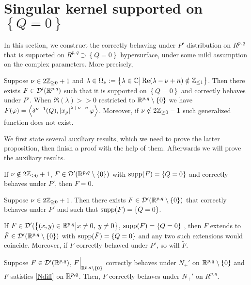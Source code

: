 \documentclass[10pt]{article} %
\newcommand{\D}{\mathcal{D}}
\theoremstyle{definition}
\theoremstyle{remark}
\begin{document}
\section{Singular kernel supported on $\left\{ Q=0 \right\}$}
In this section, we construct the correctly behaving under $P'$ distribution on $R^{p,q}$ that is supported on
$R^{p,q}\supset\left\{ Q=0 \right\}$ hypersurface, under some mild assumption on the complex parameters. More precisely,
\begin{myprop}
	Suppose $\nu\in2\mathbb{Z}_{\geq0}+1$ and $\lambda\in\Omega_\nu:=
	\left\{\lambda\in\mathbb{C}\big| \operatorname{Re}(\lambda-\nu+n)\notin\mathbb{Z}_{\leq1}\right\}$.
	Then there exists $F\in\D'(\R^{p,q})$ such that it is supported on $\left\{ Q=0 \right\}$ and correctly behaves
	under $P'$. When $\Re(\lambda)>>0$ restricted to $\mathbb{R}^{p,q}\setminus\left\{ 0 \right\}$ we have $F(\varphi)=\left<
		\delta^{\nu-1}(Q),\left|x_p\right|^{\lambda+\nu-n}\varphi\right>$.
	Moreover, if $\nu\notin2\mathbb{Z}_{\geq0}-1$ such generalized function does not exist.
	\label{thm:sing_q}
\end{myprop}
We first state several auxiliary results, which we need to prove the latter proposition, then finish a proof with the help of them.
Afterwards we will prove the auxiliary results.
\begin{mylem}
	If $\nu\notin2\mathbb{Z}_{\geq0}+1$, $F\in\D'(\R^{p,q}\setminus\left\{ 0 \right\})$ with $\operatorname{supp}(F)=\left\{ Q=0 \right\}$
	and correctly behaves under $P'$,
	then $F=0$.
	\label{lem:sing_q_1}
\end{mylem}
\begin{mylem}
	Suppose $\nu\in2\mathbb{Z}_{\geq0}+1$. Then there exists $F\in\D'(\R^{p,q}\setminus\left\{ 0 \right\})$
	that correctly behaves under $P'$ and such that $\operatorname{supp}(F)=\left\{ Q=0 \right\}$.
	\label{lem:sing_q_2}
\end{mylem}
\begin{mylem}
	If $F\in\D'(\mysetn{(x,y)\in\R^{p,q}}{x\neq0,\;y\neq0}$, $\operatorname{supp}(F)=\left\{ Q=0 \right\}$
	, then $F$ extends to $\tilde{F}\in\D'(\R^{p,q}\setminus\left\{ 0 \right\})$ with $\operatorname{supp}(\tilde{F})=\left\{ Q=0 \right\}$
	and any two such extensions would coincide.
	Moreover, if $F$ correctly behaved under $P'$, so will $\tilde{F}$.
	\label{lem:sing_q_3}
\end{mylem}
\begin{mylem}
	Suppose $F\in\D'(\R^{p,q})$, $F\Big|_{\mathbb{R}^{p,q}\setminus\left\{ 0 \right\}}$ correctly behaves under $N_+'$ on $\mathbb{R}^{p,q}
	\setminus\left\{ 0 \right\}$ and $F$ satisfies \eqref{Ndiff} on $\mathbb{R}^{p,q}$. Then, $F$ correctly behaves under $N_{+}'$
	on $R^{p,q}$.
	\label{lem:sing_q_4}
\end{mylem}
\end{document}
